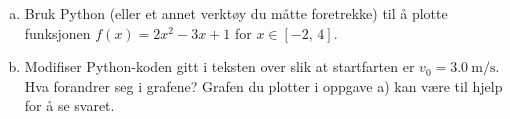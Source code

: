 %
\begin{enumerate}[a)]
    \item Bruk Python (eller et annet verktøy du måtte foretrekke) til å plotte funksjonen $f(x) = 2x^2 - 3x + 1$ for $x \in [-2,\, 4]$.
    \item Modifiser Python-koden gitt i teksten over slik at startfarten er $v_0 = \SI{3.0}{\metre\per\second}$. Hva forandrer seg i grafene? Grafen du plotter i oppgave a) kan være til hjelp for å se svaret.
\end{enumerate}
